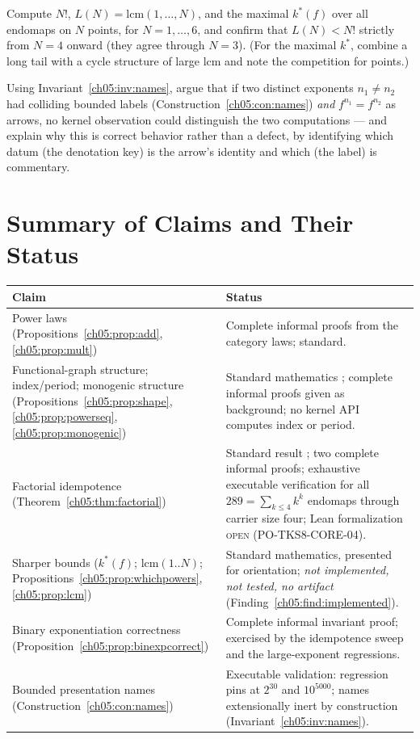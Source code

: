 \begin{exercise}
\label{ch05:ex:lcmsharp}
Compute $N!$, $L(N) = \mathrm{lcm}(1, \dots, N)$, and the maximal
$k^{*}(f)$ over all endomaps on $N$ points, for $N = 1, \dots, 6$, and
confirm that $L(N) < N!$ strictly from $N = 4$ onward (they agree through
$N = 3$). (For the maximal $k^{*}$,
combine a long tail with a cycle structure of large lcm and note the
competition for points.)
\end{exercise}

\begin{exercise}
\label{ch05:ex:namescollide}
Using Invariant~\ref{ch05:inv:names}, argue that if two distinct exponents
$n_1 \ne n_2$ had colliding bounded labels
(Construction~\ref{ch05:con:names}) \emph{and} $f^{n_1} = f^{n_2}$ as
arrows, no kernel observation could distinguish the two computations ---
and explain why this is correct behavior rather than a defect, by
identifying which datum (the denotation key) is the arrow's identity and
which (the label) is commentary.
\end{exercise}

\section{Summary of Claims and Their Status}
\label{ch05:sec:summary}

\begin{center}
\small
\begin{tabular}{@{}p{5.6cm}p{7.2cm}@{}}
\toprule
Claim & Status \\
\midrule
Power laws (Propositions~\ref{ch05:prop:add}, \ref{ch05:prop:mult}) &
Complete informal proofs from the category laws; standard. \\
Functional-graph structure; index/period; monogenic structure
(Propositions~\ref{ch05:prop:shape}, \ref{ch05:prop:powerseq},
\ref{ch05:prop:monogenic}) &
Standard mathematics \cite{howie, pin}; complete informal proofs given as
background; no kernel API computes index or period. \\
Factorial idempotence (Theorem~\ref{ch05:thm:factorial}) &
Standard result \cite{pin, howie}; two complete informal proofs; exhaustive
executable verification for all $289 = \sum_{k \le 4} k^{k}$ endomaps
through carrier size four; Lean formalization \textsc{open}
(PO-TKS8-CORE-04). \\
Sharper bounds ($k^{*}(f)$; $\mathrm{lcm}(1..N)$;
Propositions~\ref{ch05:prop:whichpowers}, \ref{ch05:prop:lcm}) &
Standard mathematics, presented for orientation; \emph{not implemented,
not tested, no artifact} (Finding~\ref{ch05:find:implemented}). \\
Binary exponentiation correctness
(Proposition~\ref{ch05:prop:binexpcorrect}) &
Complete informal invariant proof; exercised by the idempotence sweep and
the large-exponent regressions. \\
Bounded presentation names (Construction~\ref{ch05:con:names}) &
Executable validation: regression pins at $2^{30}$ and $10^{5000}$; names
extensionally inert by construction
(Invariant~\ref{ch05:inv:names}). \\
\bottomrule
\end{tabular}
\end{center}

